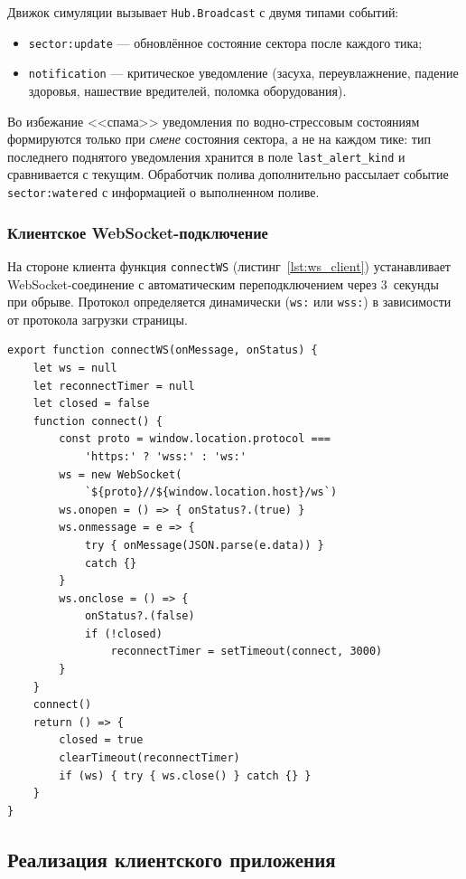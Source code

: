 Движок симуляции вызывает \texttt{Hub.Broadcast} с двумя
типами событий:
\begin{itemize}
    \item \texttt{sector:update} --- обновлённое состояние
    сектора после каждого тика;
    \item \texttt{notification} --- критическое уведомление
    (засуха, переувлажнение, падение здоровья, нашествие
    вредителей, поломка оборудования).
\end{itemize}

Во избежание <<спама>> уведомления по водно-стрессовым
состояниям формируются только при \emph{смене} состояния
сектора, а не на каждом тике: тип последнего поднятого
уведомления хранится в поле \texttt{last\_alert\_kind} и
сравнивается с текущим. Обработчик полива дополнительно
рассылает событие \texttt{sector:watered} с информацией о
выполненном поливе.

\subsubsection{Клиентское WebSocket-подключение}

На стороне клиента функция \texttt{connectWS}
(листинг~\ref{lst:ws_client}) устанавливает WebSocket-соединение
с автоматическим переподключением через 3~секунды при обрыве.
Протокол определяется динамически (\texttt{ws:} или
\texttt{wss:}) в зависимости от протокола загрузки страницы.

\begin{lstlisting}[caption={Клиентское WebSocket-подключение (api.js)}, label={lst:ws_client}]
export function connectWS(onMessage, onStatus) {
    let ws = null
    let reconnectTimer = null
    let closed = false
    function connect() {
        const proto = window.location.protocol ===
            'https:' ? 'wss:' : 'ws:'
        ws = new WebSocket(
            `${proto}//${window.location.host}/ws`)
        ws.onopen = () => { onStatus?.(true) }
        ws.onmessage = e => {
            try { onMessage(JSON.parse(e.data)) }
            catch {}
        }
        ws.onclose = () => {
            onStatus?.(false)
            if (!closed)
                reconnectTimer = setTimeout(connect, 3000)
        }
    }
    connect()
    return () => {
        closed = true
        clearTimeout(reconnectTimer)
        if (ws) { try { ws.close() } catch {} }
    }
}
\end{lstlisting}


\subsection{Реализация клиентского приложения}

